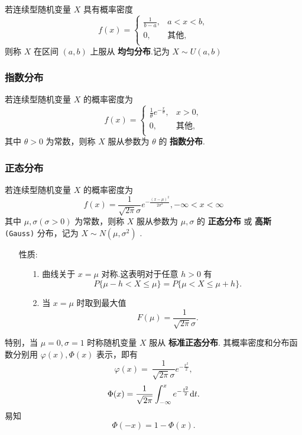 \documentclass[UTF8,10pt]{ctexart}
\begin{document}
	若连续型随机变量 $ X $ 具有概率密度 $$ f(x)= \begin{cases} \frac{1}{b-a}, & a<x<b,\\ 0, & \mbox{其他},\\ \end{cases} $$ 
	则称 $ X $ 在区间 $ (a,b) $ 上服从 \textbf{均匀分布}.记为 $ X \sim U(a,b) $
	
	\subsubsection{指数分布}
	
	若连续型随机变量 $ X $ 的概率密度为 $$ f(x)= \begin{cases} \frac{1}{ \theta } e^{- \frac{x}{ \theta } }, & x>0,\\ 0, & \mbox{其他},\\ \end{cases} $$ 
	其中 $ \theta >0 $ 为常数，则称 $ X $ 服从参数为 $ \theta $ 的 \textbf{指数分布}.
	
	\subsubsection{正态分布}
	
	若连续型随机变量 $ X $ 的概率密度为 $$ f(x)= \frac{1}{ \sqrt{2 \pi } \sigma } e^{- \frac{(x- \mu )^{2}}{2 \sigma ^{2}} }, - \infty <x< \infty $$ 其中 $ \mu , \sigma ( \sigma >0) $ 为常数，则称 $ X $ 服从参数为 $ \mu , \sigma $ 的 \textbf{正态分布} 或 \textbf{高斯} \texttt{(Gauss)} 分布，记为 $ X \sim N( \mu , \sigma ^{2}) $ .
	
	\begin{itemize}
		\item [性质:] {
			\begin{enumerate}
				\item [1.] 曲线关于 $ x= \mu $ 对称.这表明对于任意 $ h>0 $ 有 $$ P\{ \mu -h<X \le \mu \}=P\{ \mu < X \le \mu +h\}. $$
				\item [2.] 当 $ x= \mu $ 时取到最大值 $$ F( \mu )= \frac{1}{ \sqrt{2 \pi } \sigma }. $$
			\end{enumerate}
		}
	\end{itemize}

	特别，当 $ \mu =0, \sigma =1 $ 时称随机变量 $ X $ 服从 \textbf{标准正态分布}. 其概率密度和分布函数分别用 $ \varphi(x) , \Phi(x) $ 表示，即有 $$ \varphi(x) =\ \frac{1}{ \sqrt{2 \pi } \sigma } e^{- \frac{x^{2}}{2}}, $$ $$ \Phi(x) = \frac{1}{ \sqrt{2 \pi }} \int_{- \infty }^{x} e^{- \frac{t^{2}}{2}} {\rm d} t. $$
	易知 $$ \Phi(-x) =1- \Phi(x). $$
\end{document}
